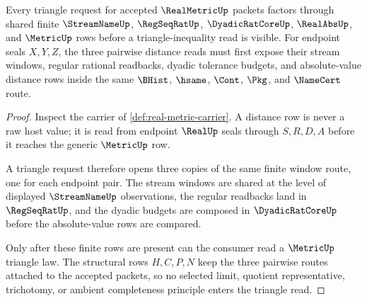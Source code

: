 \begin{theorem}
\label{thm:real-metric-triangle-window-stability}
Every triangle request for accepted $\RealMetricUp$ packets factors through shared finite $\StreamNameUp$, $\RegSeqRatUp$, $\DyadicRatCoreUp$, $\RealAbsUp$, and $\MetricUp$ rows before a triangle-inequality read is visible. For endpoint seals $X,Y,Z$, the three pairwise distance reads must first expose their stream windows, regular rational readbacks, dyadic tolerance budgets, and absolute-value distance rows inside the same $\BHist$, $\hsame$, $\Cont$, $\Pkg$, and $\NameCert$ route.
\end{theorem}
\begin{proof}
Inspect the carrier of \autoref{def:real-metric-carrier}. A distance row is never a raw host value; it is read from endpoint $\RealUp$ seals through $S,R,D,A$ before it reaches the generic $\MetricUp$ row.

A triangle request therefore opens three copies of the same finite window route, one for each endpoint pair. The stream windows are shared at the level of displayed $\StreamNameUp$ observations, the regular readbacks land in $\RegSeqRatUp$, and the dyadic budgets are composed in $\DyadicRatCoreUp$ before the absolute-value rows are compared.

Only after these finite rows are present can the consumer read a $\MetricUp$ triangle law. The structural rows $H,C,P,N$ keep the three pairwise routes attached to the accepted packets, so no selected limit, quotient representative, trichotomy, or ambient completeness principle enters the triangle read.
\end{proof}


